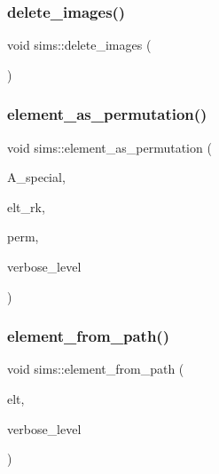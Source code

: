\mbox{\label{classsims_a5a4fd410f399c81c847052861e3bc3ff}} 
\subsubsection{\texorpdfstring{delete\+\_\+images()}{delete\_images()}}
{\footnotesize\ttfamily void sims\+::delete\+\_\+images (\begin{DoxyParamCaption}{ }\end{DoxyParamCaption})}

\mbox{\label{classsims_ad0740e3e94b3e417dbedf96666cd9add}} 
\subsubsection{\texorpdfstring{element\+\_\+as\+\_\+permutation()}{element\_as\_permutation()}}
{\footnotesize\ttfamily void sims\+::element\+\_\+as\+\_\+permutation (\begin{DoxyParamCaption}\item[{\mbox{\hyperlink{classaction}{action}} $\ast$}]{A\+\_\+special,  }\item[{\mbox{\hyperlink{galois_8h_a09fddde158a3a20bd2dcadb609de11dc}{I\+NT}}}]{elt\+\_\+rk,  }\item[{\mbox{\hyperlink{galois_8h_a09fddde158a3a20bd2dcadb609de11dc}{I\+NT}} $\ast$}]{perm,  }\item[{\mbox{\hyperlink{galois_8h_a09fddde158a3a20bd2dcadb609de11dc}{I\+NT}}}]{verbose\+\_\+level }\end{DoxyParamCaption})}

\mbox{\label{classsims_a4a9bc25b1b8e61ba34d6d3d9f9fb8ab8}} 
\subsubsection{\texorpdfstring{element\+\_\+from\+\_\+path()}{element\_from\_path()}}
{\footnotesize\ttfamily void sims\+::element\+\_\+from\+\_\+path (\begin{DoxyParamCaption}\item[{\mbox{\hyperlink{galois_8h_a09fddde158a3a20bd2dcadb609de11dc}{I\+NT}} $\ast$}]{elt,  }\item[{\mbox{\hyperlink{galois_8h_a09fddde158a3a20bd2dcadb609de11dc}{I\+NT}}}]{verbose\+\_\+level }\end{DoxyParamCaption})}

